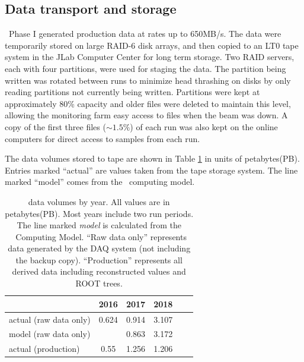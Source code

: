 \subsection{Data transport and storage \label{sec:onlineprocessing}}

\GX ~Phase I generated production data at rates up to 650MB/s. The data were temporarily stored on large RAID-6 disk arrays, and then copied to an LT0 tape system in the JLab Computer Center for long term storage. Two RAID servers, each with four partitions, were used for staging the data. The partition being written was rotated between runs  to minimize head thrashing on disks by only reading partitions not currently being written. Partitions were kept at approximately 80\% capacity and older files were deleted to maintain this level,  allowing the monitoring farm easy access to files when the beam was down. A copy of the first three files ($\sim1.5\%$) of each run was also kept on the online computers for direct access to samples from each run.      

The data volumes stored to tape are shown in Table \ref{tab:online_data_volumes} in units of petabytes(PB). Entries marked ``actual'' are values taken from the tape storage system. The line marked ``model'' comes from the \GX ~computing model\cite{gx3821}.

\begin{table}[]
    \centering
    \begin{tabular}{|l|c|c|c|c|c|}
    \hline
                           & \textbf{2016}  & \textbf{2017}  & \textbf{2018} \\
    \hline
    actual (raw data only) & 0.624 & 0.914 & 3.107 \\
    \hline
     model (raw data only) &       & 0.863 & 3.172 \\
    \hline
    \hline
    actual (production)    & 0.55  & 1.256 & 1.206 \\
    \hline
    \end{tabular}
    \caption{\GX{} data volumes by year. All values are in petabytes(PB). Most years include two run periods. The line marked \textit{model} is calculated from the \GX ~Computing Model\cite{gx3821}. ``Raw data only'' represents data generated by the DAQ system (not including the backup copy). ``Production'' represents all derived data including reconstructed values and ROOT trees. }
    \label{tab:online_data_volumes}
\end{table}

